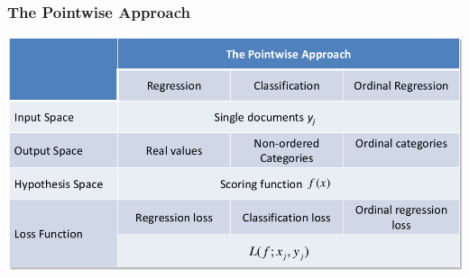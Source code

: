 \documentclass{beamer}
\begin{document}
\begin{frame}
    \frametitle{The Pointwise Approach}
    \centering
    \includegraphics[width=\linewidth]{pointwise}
\end{frame}

\end{document}
